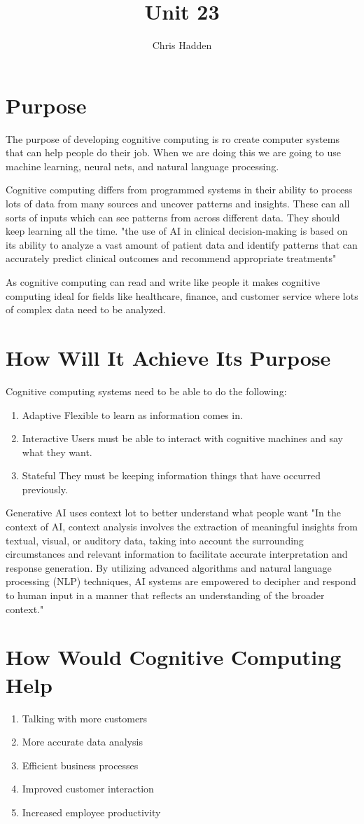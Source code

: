 \documentclass{article}
\title{Unit 23}
\author{Chris Hadden}
\date{}
\begin{document}
\maketitle

\section{Purpose}
The purpose of developing cognitive computing is ro create computer systems that can help people do their job. When we are doing this we are going to use machine learning, neural nets, and natural language processing.

Cognitive computing differs from programmed systems in their ability to process lots of data from many sources and uncover patterns and insights. These can all sorts of inputs which can see patterns from across different data. They should keep learning all the time. \cite{transform} "the use of AI in clinical decision-making is based on its ability to analyze a vast amount of patient data and identify patterns that can accurately predict clinical outcomes and recommend appropriate treatments"

As cognitive computing can read and write like people it makes cognitive computing ideal for fields like healthcare, finance, and customer service where lots of complex data need to be analyzed.

\section{How Will It Achieve Its Purpose}
Cognitive computing systems need to be able to do the following:

\begin{enumerate}
	\item Adaptive Flexible to learn as information comes in.
	\item Interactive Users must be able to interact with cognitive machines and say what they want.
	\item Stateful They must be keeping information things that have occurred previously.
\end{enumerate}

Generative AI uses context lot to better understand what people want "In the context of AI, context analysis involves the extraction of meaningful insights from textual, visual, or auditory data, taking into account the surrounding circumstances and relevant information to facilitate accurate interpretation and response generation. By utilizing advanced algorithms and natural language processing (NLP) techniques, AI systems are empowered to decipher and respond to human input in a manner that reflects an understanding of the broader context."\cite{context}

\section{How Would Cognitive Computing Help}
\begin{enumerate}
	\item Talking with more customers
	\item More accurate data analysis
	\item Efficient business processes
	\item Improved customer interaction
	\item Increased employee productivity
\end{enumerate}

\break


\end{document}
